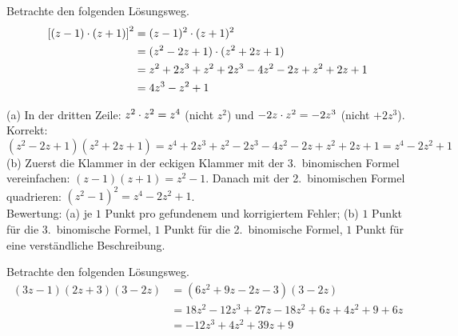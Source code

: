 \documentclass[11pt]{exam}
\begin{document}
\begin{questions}
\noaddpoints
\question[\totalpoints] %
\addpoints
Betrachte den folgenden Lösungsweg.
\begin{align*}
    \left[(z-1)\cdot(z+1)\right]^2&=(z-1)^2\cdot(z+1)^2\\
    &=(z^2-2z+1)\cdot(z^2+2z+1)\\
    &=z^2+2z^3+z^2+2z^3-4z^2-2z+z^2+2z+1\\
    &=4z^3-z^2+1
\end{align*}

{\begin{solution}
	(a) In der dritten Zeile: $z^2\cdot z^2=z^4$ (nicht $z^2$) und $-2z\cdot z^2=-2z^3$ (nicht $+2z^3$). Korrekt:
	\[(z^2-2z+1)(z^2+2z+1)=z^4+2z^3+z^2-2z^3-4z^2-2z+z^2+2z+1=z^4-2z^2+1\]
	(b) Zuerst die Klammer in der eckigen Klammer mit der 3.\ binomischen Formel vereinfachen: $(z-1)(z+1)=z^2-1$. Danach mit der 2.\ binomischen Formel quadrieren: $(z^2-1)^2=z^4-2z^2+1$.\\
	Bewertung: (a) je $1$ Punkt pro gefundenem und korrigiertem Fehler; (b) $1$ Punkt für die 3.\ binomische Formel, $1$ Punkt für die 2.\ binomische Formel, $1$ Punkt für eine verständliche Beschreibung.
\end{solution}}
{}

\noaddpoints
\question[\totalpoints] %
\addpoints
Betrachte den folgenden Lösungsweg.
\begin{align*}
    (3z-1)(2z+3)(3-2z)&=(6z^2+9z-2z-3)(3-2z)\\
    &=18z^2-12z^3+27z-18z^2+6z+4z^2+9+6z\\
    &= -12z^3+4z^2+39z+9
\end{align*}
\end{questions}
\end{document}
